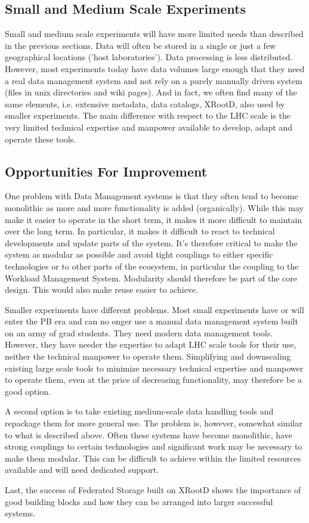 \subsection{Small and Medium Scale Experiments}
Small and medium scale experiments will have more limited needs than described in the previous sections. Data will often be stored in a single or 
just a few geographical locations ('host laboratories'). Data processing is less distributed. However, most experiments today have data volumes large 
enough that they need a real data management system and not rely on a purely manually driven system (files in unix directories and wiki pages). 
And in fact, we often find many of the same elements, i.e. extensive metadata, data catalogs, XRootD, also used by smaller 
experiments. The main difference with respect to the LHC scale is the very limited technical expertise and manpower available to develop, adapt and 
operate these tools.





\subsection{Opportunities For Improvement}
One problem with Data Management systems is that they often tend to become monolithic as more and more functionality is 
added (organically). While this may make it easier to operate in the short term, it makes it more difficult to maintain over 
the long term. In particular, it makes it difficult to react to technical developments and update parts of the system. It's 
therefore critical to make the system as modular as possible and avoid tight couplings to either specific technologies or 
to other parts of the ecosystem, in particular the coupling to the Workload Management System. Modularity should therefore be 
part of the core design. This would also make reuse easier to achieve. 
\par Smaller experiments have different problems. Most small experiments have or will enter the PB era and can no onger use a manual 
data management system built on an army of grad students. They need modern data management tools. However, they have needer the 
expertise to adapt LHC scale tools for their use, neither the technical manpower to operate them. Simplifying and downscaling existing 
large scale tools to minimize necessary technical expertise and manpower to operate them, even at the price of decreasing functionality, 
may therefore be a good option. 
\par A second option is to take existing medium-scale data handling tools and repackage them for more general use. The problem is, 
however, somewhat similar to what is described above. Often these systems have become monolithic, have strong couplings to certain 
technologies and significant work may be 
necessary to make them modular. This can be difficult to achieve within the limited resources available and will need dedicated support.
\par Last, the success of Federated Storage built on XRootD shows the importance of good building blocks and how they can be arranged into 
larger successful systems.






